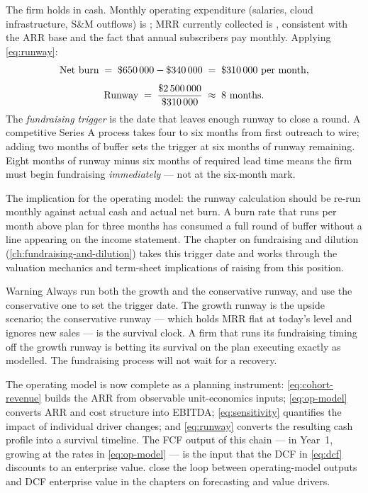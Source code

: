 \begin{example}
The firm holds  in cash. Monthly operating expenditure (salaries, cloud
infrastructure, S\&M outflows) is ; MRR currently collected is ,
consistent with the  ARR base and the fact that annual subscribers pay monthly.
Applying \cref{eq:runway}:
\[
  \text{Net burn}
  \;=\; \$\num{650000} - \$\num{340000}
  \;=\; \$\num{310000}\text{ per month},
\]
\[
  \text{Runway}
  \;=\; \frac{\$\num{2500000}}{\$\num{310000}}
  \;\approx\; \text{8 months}.
\]
The \emph{fundraising trigger} is the date that leaves enough runway to close a round. A
competitive Series A process takes four to six months from first outreach to wire; adding two
months of buffer sets the trigger at six months of runway remaining. Eight months of runway
minus six months of required lead time means the firm must begin fundraising \emph{immediately}
--- not at the six-month mark.

The implication for the operating model: the runway calculation should be re-run monthly
against actual cash and actual net burn. A burn rate that runs  per month above
plan for three months has consumed a full round of buffer without a line appearing on the
income statement. The chapter on fundraising and dilution (\cref{ch:fundraising-and-dilution})
takes this trigger date and works through the valuation mechanics and term-sheet implications
of raising from this position.
\end{example}

\begin{admonition}{Warning}
Always run both the growth and the conservative runway, and use the conservative one to
set the trigger date. The growth runway is the upside scenario; the conservative runway ---
which holds MRR flat at today's level and ignores new sales --- is the survival clock. A firm
that runs its fundraising timing off the growth runway is betting its survival on the plan
executing exactly as modelled. The fundraising process will not wait for a recovery.
\end{admonition}

The operating model is now complete as a planning instrument: \cref{eq:cohort-revenue} builds
the ARR from observable unit-economics inputs; \cref{eq:op-model} converts ARR and cost
structure into EBITDA; \cref{eq:sensitivity} quantifies the impact of individual driver changes;
and \cref{eq:runway} converts the resulting cash profile into a survival timeline. The FCF
output of this chain ---  in Year~1, growing at the rates in \cref{eq:op-model}
--- is the input that the DCF in \cref{eq:dcf} discounts to an enterprise value.
\textcite{koller2025valuation} close the loop between operating-model outputs and DCF
enterprise value in the chapters on forecasting and value drivers.
